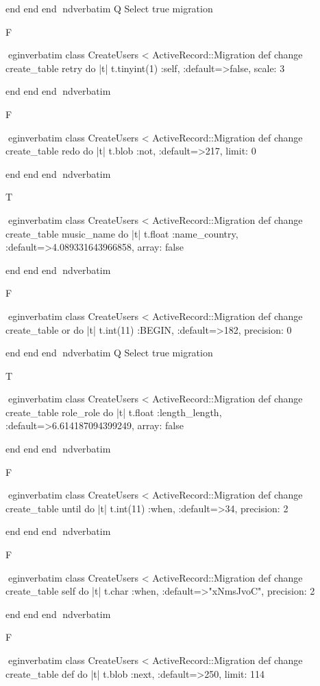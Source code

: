    end 
  end 
end
nd{verbatim}
Q
 Select true migration

F

egin{verbatim}
 class CreateUsers < ActiveRecord::Migration 
  def change 
    create_table retry do |t| 
      t.tinyint(1) :self, :default=>false, scale: 3
    
    end 
  end 
end
nd{verbatim}

F

egin{verbatim}
 class CreateUsers < ActiveRecord::Migration 
  def change 
    create_table redo do |t| 
      t.blob :not, :default=>217, limit: 0
    
    end 
  end 
end
nd{verbatim}

T

egin{verbatim}
 class CreateUsers < ActiveRecord::Migration 
  def change 
    create_table music_name do |t| 
      t.float :name_country, :default=>4.089331643966858, array: false
    
    end 
  end 
end
nd{verbatim}

F

egin{verbatim}
 class CreateUsers < ActiveRecord::Migration 
  def change 
    create_table or do |t| 
      t.int(11) :BEGIN, :default=>182, precision: 0
    
    end 
  end 
end
nd{verbatim}
Q
 Select true migration

T

egin{verbatim}
 class CreateUsers < ActiveRecord::Migration 
  def change 
    create_table role_role do |t| 
      t.float :length_length, :default=>6.614187094399249, array: false
    
    end 
  end 
end
nd{verbatim}

F

egin{verbatim}
 class CreateUsers < ActiveRecord::Migration 
  def change 
    create_table until do |t| 
      t.int(11) :when, :default=>34, precision: 2
    
    end 
  end 
end
nd{verbatim}

F

egin{verbatim}
 class CreateUsers < ActiveRecord::Migration 
  def change 
    create_table self do |t| 
      t.char :when, :default=>"xNmsJvoC", precision: 2
    
    end 
  end 
end
nd{verbatim}

F

egin{verbatim}
 class CreateUsers < ActiveRecord::Migration 
  def change 
    create_table def do |t| 
      t.blob :next, :default=>250, limit: 114
    
